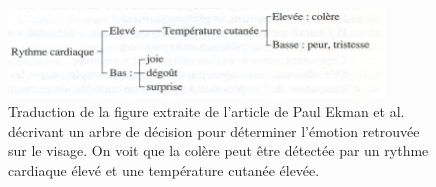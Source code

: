 \begin{figure}
  \centering
  \includegraphics[width=10cm]{./Chapitre1/figures/Ekman1983.png}
  \caption{Traduction de la figure extraite de l'article de Paul Ekman et al.~\cite{Ekman1983} décrivant un arbre de décision pour déterminer l'émotion retrouvée sur le visage. On voit que la colère peut être détectée par un rythme cardiaque élevé et une température cutanée élevée.}
  \label{fig:Ekman1983}
\end{figure}
